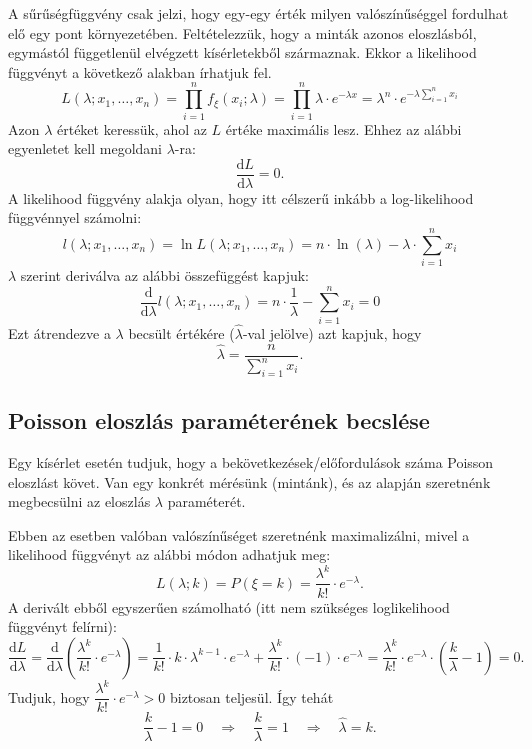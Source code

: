 \documentclass[a4paper]{article}
\begin{document}
A sűrűségfüggvény csak jelzi, hogy egy-egy érték milyen valószínűséggel fordulhat elő egy pont környezetében.
Feltételezzük, hogy a minták azonos eloszlásból, egymástól függetlenül elvégzett kísérletekből származnak.
Ekkor a likelihood függvényt a következő alakban írhatjuk fel.
\[
\displaystyle
L(\lambda; x_1, \ldots, x_n) =
\prod_{i=1}^{n} f_{\xi}(x_i; \lambda) =
\prod_{i=1}^{n} \lambda \cdot e^{-\lambda x} =
\lambda^n \cdot e^{-\lambda \sum_{i=1}^{n} x_i}
\]
Azon $\lambda$ értéket keressük, ahol az $L$ értéke maximális lesz.
Ehhez az alábbi egyenletet kell megoldani $\lambda$-ra:
\[
\dfrac{\mathrm{d}L}{\mathrm{d}\lambda} = 0.
\]
A likelihood függvény alakja olyan, hogy itt célszerű inkább a log-likelihood függvénnyel számolni:
\[
l(\lambda; x_1, \ldots, x_n) =
\ln L(\lambda; x_1, \ldots, x_n) =
n \cdot \ln(\lambda) - \lambda \cdot \sum_{i=1}^{n} x_i
\]
$\lambda$ szerint deriválva az alábbi összefüggést kapjuk:
\[
\dfrac{\mathrm{d}}{\mathrm{d}\lambda}
l(\lambda; x_1, \ldots, x_n) =
n \cdot \dfrac{1}{\lambda} - \sum_{i=1}^{n}x_i = 0
\]
Ezt átrendezve a $\lambda$ becsült értékére ($\hat{\lambda}$-val jelölve) azt kapjuk, hogy
\[
\hat{\lambda} = \dfrac{n}{\sum_{i=1}^{n}x_i}.
\]

\subsection{Poisson eloszlás paraméterének becslése}

Egy kísérlet esetén tudjuk, hogy a bekövetkezések/előfordulások száma Poisson eloszlást követ.
Van egy konkrét mérésünk (mintánk), és az alapján szeretnénk megbecsülni az eloszlás $\lambda$ paraméterét.

Ebben az esetben valóban valószínűséget szeretnénk maximalizálni, mivel a likelihood függvényt az alábbi módon adhatjuk meg:
\[
L(\lambda; k) = P(\xi = k) = \dfrac{\lambda^k}{k!} \cdot e^{-\lambda}.
\]
A derivált ebből egyszerűen számolható (itt nem szükséges loglikelihood függvényt felírni):
\[
\dfrac{\mathrm{d}L}{\mathrm{d}\lambda} =
\dfrac{\mathrm{d}}{\mathrm{d}\lambda} \left( \dfrac{\lambda^k}{k!} \cdot e^{-\lambda}\right) =
\dfrac{1}{k!} \cdot k \cdot \lambda^{k-1} \cdot e^{-\lambda} + \dfrac{\lambda^k}{k!} \cdot (-1) \cdot e^{-\lambda} =
\dfrac{\lambda^k}{k!} \cdot e^{-\lambda} \cdot \left( \dfrac{k}{\lambda} - 1 \right) = 0.
\]
Tudjuk, hogy $\dfrac{\lambda^k}{k!} \cdot e^{-\lambda} > 0$ biztosan teljesül.
Így tehát
\[
\dfrac{k}{\lambda} - 1 = 0 \quad \Rightarrow \quad
\dfrac{k}{\lambda} = 1 \quad \Rightarrow \quad
\hat{\lambda} = k.
\]
\end{document}
